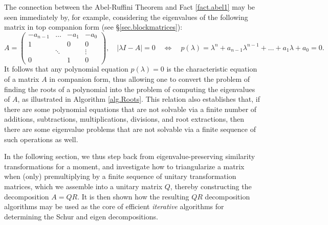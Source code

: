 The connection between the Abel-Ruffini Theorem and Fact \ref{fact.abel1} may be seen immediately by, for example, considering the
eigenvalues of the following matrix in top companion form (see \S \ref{sec.blockmatrices}):
\begin{equation*}
   A=\begin{pmatrix} -a_{n-1} &\ldots &  -a_{1} &  -a_0 \\
                     1        &       & 0         & 0 \\ 
                              &\ddots &           & \vdots \\ 
                     0        &       & 1         & 0 \end{pmatrix}, \quad
  |\lambda I - A|=0 \quad \Leftrightarrow \quad p(\lambda) = \lambda^n + a_{n-1} \lambda^{n-1} + \ldots + a_1 \lambda + a_0 = 0.
\end{equation*}
It follows that any polynomial equation $p(\lambda) = 0$ is the characteristic equation of a matrix $A$ in companion form,
thus allowing one to convert the problem of finding the roots of a polynomial into the problem of computing the eigenvalues of $A$,
as illustrated in Algorithm \ref{alg.Roots}.
This relation also establishes that, if there are some polynomial equations that are not solvable
via a finite number of additions, subtractions, multiplications, divisions, and root extractions,
then there are some eigenvalue problems that are not solvable via a finite sequence of such operations as well.

\begin{figure*}[t]
\end{figure*}

In the following section, we thus step back from eigenvalue-preserving similarity transformations for a moment,
and investigate how to triangularize a matrix when (only) premultiplying by a finite sequence of unitary transformation matrices,
which we assemble into a unitary matrix $Q$, thereby constructing the decomposition $A=QR$.  It is then shown how the
resulting $QR$ decomposition algorithms may be used as the core of efficient {\it iterative} algorithms for determining
the Schur and eigen decompositions.

